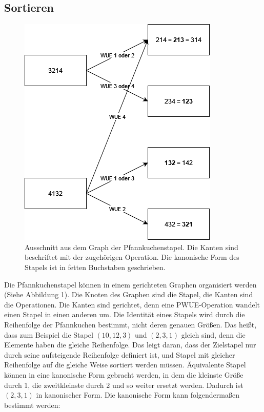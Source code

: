 \documentclass[a4paper,10pt,ngerman]{scrartcl}
\begin{document}
\subsection{Sortieren}
\begin{figure}[t]
  \includegraphics[scale=0.5]{pancakegraph}
  \centering
  \caption{Ausschnitt aus dem Graph der Pfannkuchenstapel. Die Kanten sind beschriftet mit der zugehörigen Operation. Die kanonische Form des Stapels ist
    in fetten Buchstaben geschrieben.}
\end{figure}
Die Pfannkuchenstapel können in einem gerichteten Graphen organisiert werden (Siehe Abbildung 1). Die Knoten des Graphen
sind die Stapel, die Kanten sind die Operationen. Die Kanten sind gerichtet, denn eine PWUE-Operation
wandelt einen Stapel in einen anderen um. Die Identität eines Stapels wird durch die Reihenfolge der Pfannkuchen bestimmt,
nicht deren genauen Größen. Das heißt, dass zum Beispiel die Stapel $(10,12,3)$ und $(2,3,1)$ gleich sind, denn die Elemente haben die gleiche
Reihenfolge. Das leigt daran, dass der Zielstapel nur durch seine aufsteigende Reihenfolge definiert ist, und Stapel mit gleicher Reihenfolge
auf die gleiche Weise sortiert werden müssen. Äquivalente Stapel können
in eine kanonische Form gebracht werden, in dem die kleinste Größe durch 1, die zweitkleinste durch 2 und so weiter ersetzt werden. Dadurch ist
$(2,3,1)$ in kanonischer Form. Die kanonische Form kann folgendermaßen bestimmt werden:
\begin{algorithmic}
  \EndFor

  \EndIf
  \EndFor
  \EndFor

  \EndProcedure
\end{algorithmic}
\end{document}
